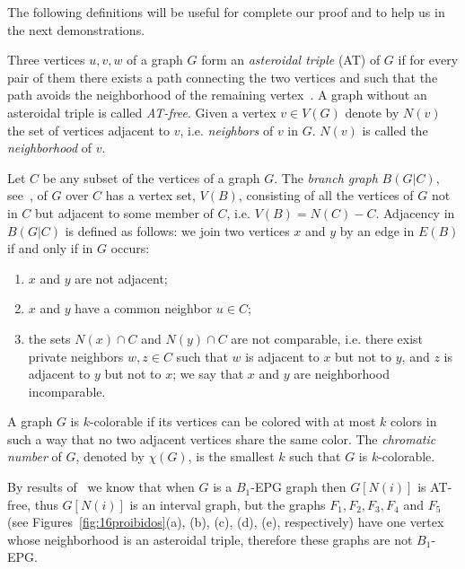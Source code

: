 \documentclass[9pt]{entcs}
\newtheorem{teo}{Theorem}[section]
\begin{document}


The following definitions will be useful for complete our proof and to help us in the next demonstrations.

Three vertices $u, v, w$ of a graph $G$ form an \textit{asteroidal triple} (AT) of $G$ if for every pair of them there exists a path connecting the two vertices and such that the path avoids the neighborhood of the remaining vertex~\cite{Asinowski2009}. A graph without an asteroidal triple is called \textit{AT-free}. Given a vertex $v\in V(G)$ denote by $N(v)$ the set of vertices adjacent to $v$, i.e. \textit{neighbors} of $v$ in $G$. $N(v)$ is called the  \textit{neighborhood} of $v$.

Let $C$ be any subset of the vertices of a graph $G$. The \textit{branch graph} $B(G|C)$, see~\cite{golumbic2009}, of $G$ over $C$ has a vertex set, $V(B)$, consisting of all the vertices of $G$ not in $C$ but adjacent to some member of $C$, i.e. $V(B) = N(C) - C$. Adjacency in $B(G|C)$ is defined as follows: we join two vertices $x$ and $y$ by an edge in $E(B)$ if and only if in $G$ occurs:
\begin{enumerate}
    \item  $x$ and $y$ are not adjacent;
    \item $x$ and $y$ have a common neighbor $u \in C$;
    \item the sets $N(x) \cap C$ and $N(y) \cap C$ are not comparable, i.e. there exist private neighbors $w, z \in C$ such that $w$ is adjacent to $x$ but not to $y$, and $z$ is adjacent to $y$ but not to $x$; we say that $x$ and $y$ are neighborhood incomparable.
\end{enumerate}

A graph $G$ is $k$-colorable if its vertices can be colored with at most $k$ colors in such a way that no two adjacent vertices share the same color. The \textit{chromatic number} of $G$, denoted by $\chi(G)$, is the smallest $k$ such that $G$ is $k$-colorable.


By results of~\cite{ries2009} we know that when $G$ is a $B_1$-EPG graph then $G[N(i)]$ is AT-free, thus $G[N(i)]$ is an interval graph, but the graphs $F_{1}, F_{2}, F_{3}, F_{4}$ and $F_{5}$ (see Figures~\ref{fig:16proibidos}(a), (b), (c), (d), (e), respectively) have one vertex whose neighborhood is an asteroidal triple, therefore these graphs are not  $B_1$-EPG.
\end{document}
